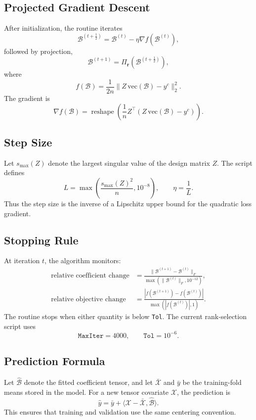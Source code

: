 \documentclass[11pt]{article}
\begin{document}
\subsection{Projected Gradient Descent}
After initialization, the routine iterates
\[
\mathcal B^{(t+\frac12)}
=
\mathcal B^{(t)}-\eta \nabla f(\mathcal B^{(t)}),
\]
followed by projection,
\[
\mathcal B^{(t+1)}
=
\Pi_{\mathbf r}\!\left(\mathcal B^{(t+\frac12)}\right),
\]
where
\[
f(\mathcal B)
=
\frac{1}{2n}\|Z\,\mathrm{vec}(\mathcal B)-y^c\|_2^2.
\]
The gradient is
\[
\nabla f(\mathcal B)
=
\operatorname{reshape}\!\left(\frac{1}{n}Z^\top(Z\,\mathrm{vec}(\mathcal B)-y^c)\right).
\]

\subsection{Step Size}
Let $s_{\max}(Z)$ denote the largest singular value of the design matrix $Z$. The script defines
\[
L
=
\max\left(\frac{s_{\max}(Z)^2}{n},10^{-8}\right),
\qquad
\eta=\frac{1}{L}.
\]
Thus the step size is the inverse of a Lipschitz upper bound for the quadratic loss gradient.

\subsection{Stopping Rule}
At iteration $t$, the algorithm monitors:
\begin{align*}
\text{relative coefficient change}
&=
\frac{\|\mathcal B^{(t+1)}-\mathcal B^{(t)}\|_F}
{\max(\|\mathcal B^{(t)}\|_F,10^{-12})},\\[4pt]
\text{relative objective change}
&=
\frac{|f(\mathcal B^{(t+1)})-f(\mathcal B^{(t)})|}
{\max(|f(\mathcal B^{(t)})|,1)}.
\end{align*}
The routine stops when either quantity is below \texttt{Tol}.
The current rank-selection script uses
\[
\texttt{MaxIter}=4000,\qquad \texttt{Tol}=10^{-6}.
\]

\subsection{Prediction Formula}
Let $\widehat{\mathcal B}$ denote the fitted coefficient tensor, and let $\bar{\mathcal X}$ and $\bar y$ be the training-fold means stored in the model. For a new tensor covariate $\mathcal X$, the prediction is
\[
\widehat y
=
\bar y + \langle \mathcal X-\bar{\mathcal X},\widehat{\mathcal B}\rangle.
\]
This ensures that training and validation use the same centering convention.
\end{document}
